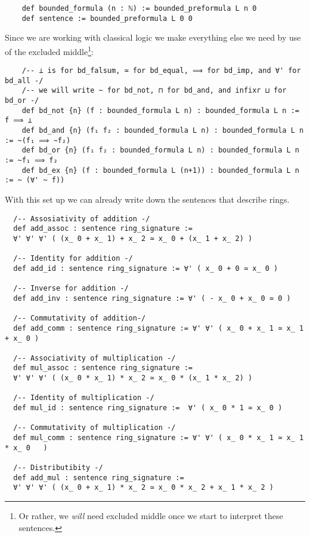 \begin{dfn}[Formulas]
\begin{lstlisting}
    def bounded_formula (n : ℕ) := bounded_preformula L n 0
    def sentence := bounded_preformula L 0 0\end{lstlisting}

  Since we are working with classical logic we
  make everything else we need by use of the excluded middle\footnote{
    Or rather, we \textit{will} need excluded middle once we start to
    interpret these sentences.
  }:

  \begin{lstlisting}
    /-- ⊥ is for bd_falsum, ≃ for bd_equal, ⟹ for bd_imp, and ∀' for bd_all -/
    /-- we will write ~ for bd_not, ⊓ for bd_and, and infixr ⊔ for bd_or -/
    def bd_not {n} (f : bounded_formula L n) : bounded_formula L n := f ⟹ ⊥
    def bd_and {n} (f₁ f₂ : bounded_formula L n) : bounded_formula L n := ~(f₁ ⟹ ∼f₂)
    def bd_or {n} (f₁ f₂ : bounded_formula L n) : bounded_formula L n := ~f₁ ⟹ f₂
    def bd_ex {n} (f : bounded_formula L (n+1)) : bounded_formula L n := ~ (∀' ~ f))
  \end{lstlisting}
\end{dfn}

With this set up we can already write down the sentences that describe rings.

\begin{lstlisting}
  /-- Assosiativity of addition -/
  def add_assoc : sentence ring_signature :=
  ∀' ∀' ∀' ( (x_ 0 + x_ 1) + x_ 2 ≃ x_ 0 + (x_ 1 + x_ 2) )

  /-- Identity for addition -/
  def add_id : sentence ring_signature := ∀' ( x_ 0 + 0 ≃ x_ 0 )

  /-- Inverse for addition -/
  def add_inv : sentence ring_signature := ∀' ( - x_ 0 + x_ 0 ≃ 0 )

  /-- Commutativity of addition-/
  def add_comm : sentence ring_signature := ∀' ∀' ( x_ 0 + x_ 1 ≃ x_ 1 + x_ 0 )

  /-- Associativity of multiplication -/
  def mul_assoc : sentence ring_signature :=
  ∀' ∀' ∀' ( (x_ 0 * x_ 1) * x_ 2 ≃ x_ 0 * (x_ 1 * x_ 2) )

  /-- Identity of multiplication -/
  def mul_id : sentence ring_signature :=  ∀' ( x_ 0 * 1 ≃ x_ 0 )

  /-- Commutativity of multiplication -/
  def mul_comm : sentence ring_signature := ∀' ∀' ( x_ 0 * x_ 1 ≃ x_ 1 * x_ 0   )

  /-- Distributibity -/
  def add_mul : sentence ring_signature :=
  ∀' ∀' ∀' ( (x_ 0 + x_ 1) * x_ 2 ≃ x_ 0 * x_ 2 + x_ 1 * x_ 2 )\end{lstlisting}

